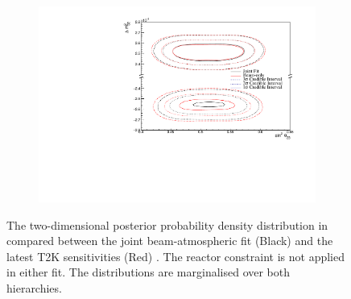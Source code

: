 \begin{figure}[h]
  \begin{subfigure}[t]{0.98\textwidth}
    \includegraphics[width=\textwidth, trim={0mm 0mm 0mm 0mm}, clip,page=1]{Figures/OA/JointFit_OA2020_Comp/ContourComparison_2D_th23_dm32_BH_1_woRC_UnSmeared_CredibleInterval.pdf}
  \end{subfigure}
  \caption{The two-dimensional posterior probability density distribution in  compared between the joint beam-atmospheric fit (Black) and the latest T2K sensitivities (Red) \cite{Dunne2020-uf, t2k_tn_393}. The reactor constraint is not applied in either fit. The distributions are marginalised over both hierarchies.}
  \label{fig:OscillationAnalysis_JointFit_OA2020_DM32TH23}
\end{figure}


